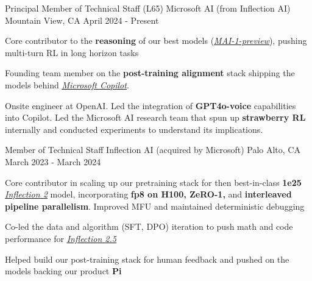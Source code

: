 
\begin{cventries}
  \cventry
    {Principal Member of Technical Staff (L65)} %
    {Microsoft AI (from Inflection AI)} %
    {Mountain View, CA} %
    {April 2024 - Present} %
    {
      \begin{cvitems} %
        \item {Core contributor to the \textbf{reasoning} of our best models (\href{https://microsoft.ai/news/two-new-in-house-models/}{\underline{\textit{MAI-1-preview}}}), pushing multi-turn RL in long horizon tasks}
        \item {Founding team member on the \textbf{post-training alignment} stack shipping the models behind \href{https://copilot.microsoft.com/}{\underline{\textit{Microsoft Copilot}}}.}
        \item {Onsite engineer at OpenAI. Led the integration of \textbf{GPT4o-voice} capabilities into Copilot. Led the Microsoft AI research team that spun up \textbf{strawberry RL} internally and conducted experiments to understand its implications.}
      \end{cvitems}
    }

  \cventry
    {Member of Technical Staff} %
    {Inflection AI (acquired by Microsoft)} %
    {Palo Alto, CA} %
    {March 2023 - March 2024} %
    {
      \begin{cvitems} %
        \item {Core contributor in scaling up our pretraining stack for then best-in-class \textbf{1e25} \href{https://inflection.ai/blog/inflection-2}{\underline{\textit{Inflection 2}}} model, incorporating \textbf{fp8 on H100, ZeRO-1,} and \textbf{interleaved pipeline parallelism}. Improved MFU and maintained deterministic debugging}
        \item {Co-led the data and algorithm (SFT, DPO) iteration to push math and code performance for \href{https://inflection.ai/blog/inflection-2-5}{\underline{\textit{Inflection 2.5}}}}
        \item {Helped build our post-training stack for human feedback and pushed on the models backing our product \textbf{Pi}}
      \end{cvitems}
    }


\end{cventries}
